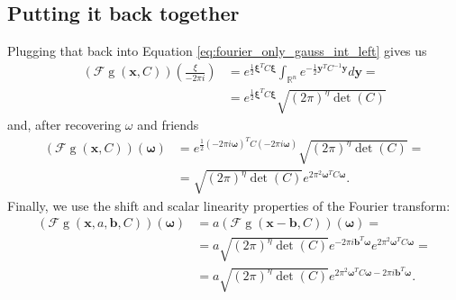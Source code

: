 \documentclass{paper}
\newcommand{\F}{\ensuremath{\mathcal{F}}}
\newcommand{\vr}[1]{\ensuremath{\boldsymbol{#1}}}
\newcommand{\f}[1]{\operatorname{#1}}
\newcommand{\omegavec}[0]{\ensuremath{\vr{\omega{}}}}
\newcommand{\xivec}[0]{\ensuremath{\vr{\xi{}}}}
\newcommand{\bvec}[0]{\ensuremath{\vr{b}}}
\newcommand{\yvec}[0]{\ensuremath{\vr{y}}}
\begin{document}
\subsection*{Putting it back together}
Plugging that back into Equation \ref{eq:fourier_only_gauss_int_left} gives us
\begin{align*}
	(\F\f{g}(\vr{x}, C))(\frac{\xi}{-2 \pi i})
	&= e^{\frac{1}{2} \xivec^T C \xivec} \int_{\mathbb{R}^n} e^{-\frac{1}{2} \yvec^T C^{-1} \yvec}  d\yvec = \\
	&= e^{\frac{1}{2} \xivec^T C \xivec} \sqrt{(2 \pi)^\eta \f{det}(C)}
\end{align*}
and, after recovering $\omega$ and friends
\begin{align*}
(\F\f{g}(\vr{x}, C))(\omegavec)
&= e^{\frac{1}{2} (-2 \pi i \omegavec)^T C (-2 \pi i \omegavec)} \sqrt{(2 \pi)^\eta \f{det}(C)} = \\
&= \sqrt{(2 \pi)^\eta \f{det}(C)} e^{2 \pi^2 \omegavec^T C \omegavec}.
\end{align*}
Finally, we use the shift and scalar linearity properties of the Fourier transform:
\begin{align}
(\F\f{g}(\vr{x}, a, \bvec, C))(\omegavec) &= a (\F\f{g}(\vr{x} - \bvec, C))(\omegavec) = \nonumber \\
&= a \sqrt{(2 \pi)^\eta \f{det}(C)} e^{-2\pi i \bvec^T \omegavec} e^{2 \pi^2 \omegavec^T C \omegavec} =\nonumber \\
\label{eq:gaussian_fourier_transform}
&= a \sqrt{(2 \pi)^\eta \f{det}(C)} e^{2 \pi^2 \omegavec^T C \omegavec - 2\pi i \bvec^T \omegavec}.
\end{align}

\clearpage
\end{document}
